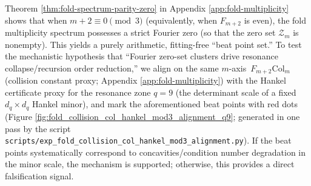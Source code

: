 \begin{remark}[Arithmetic beat marking: \texorpdfstring{$m+2\equiv 0\pmod 3$}{m+2=0 mod 3} points and Hankel certificate alignment (falsifiable)]\label{rem:pom-mod3-beat-alignment}
Theorem \ref{thm:fold-spectrum-parity-zero} in Appendix \ref{app:fold-multiplicity} shows that when \(m+2\equiv 0\pmod 3\) (equivalently, when \(F_{m+2}\) is even), the fold multiplicity spectrum possesses a strict Fourier zero (so that the zero set \(\mathcal{Z}_m\) is nonempty).
This yields a purely arithmetic, fitting-free ``beat point set.''
To test the mechanistic hypothesis that ``Fourier zero-set clusters drive resonance collapse/recursion order reduction,'' we align on the same \(m\)-axis
\(\,F_{m+2}\mathrm{Col}_m\) (collision constant proxy; Appendix \ref{app:fold-multiplicity}) with
the Hankel certificate proxy for the resonance zone \(q=9\) (the determinant scale of a fixed \(d_q\times d_q\) Hankel minor), and mark the aforementioned beat points with red dots (Figure \ref{fig:fold_collision_col_hankel_mod3_alignment_q9}; generated in one pass by the script \texttt{scripts/exp\_fold\_collision\_col\_hankel\_mod3\_alignment.py}).
If the beat points systematically correspond to concavities/condition number degradation in the minor scale, the mechanism is supported; otherwise, this provides a direct falsification signal.
\end{remark}



